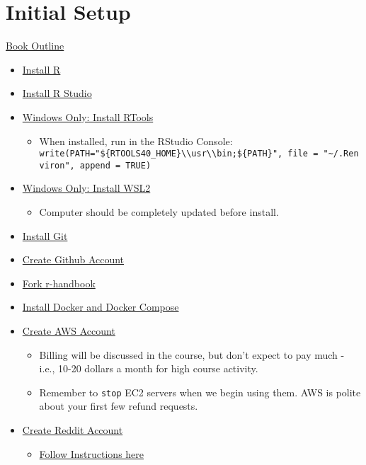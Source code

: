 \documentclass[
]{book}
\providecommand{\tightlist}{%
  \setlength{\itemsep}{0pt}\setlength{\parskip}{0pt}}
\begin{document}
\hypertarget{initial-setup}{%
\chapter{Initial Setup}\label{initial-setup}}

\href{https://hackmd.io/vGRGEPo8QQyiG8gecWv71g}{Book Outline}

\begin{itemize}
\item
  \href{https://cran.r-project.org/}{Install R}
\item
  \href{https://www.rstudio.com/products/rstudio/download/}{Install R Studio}
\item
  \href{https://cran.r-project.org/bin/windows/Rtools/}{Windows Only: Install RTools}

  \begin{itemize}
  \tightlist
  \item
    When installed, run in the RStudio Console: \texttt{write(\textquotesingle{}PATH="\$\{RTOOLS40\_HOME\}\textbackslash{}\textbackslash{}usr\textbackslash{}\textbackslash{}bin;\$\{PATH\}"\textquotesingle{},\ file\ =\ "\textasciitilde{}/.Renviron",\ append\ =\ TRUE)}
  \end{itemize}
\item
  \href{https://www.omgubuntu.co.uk/how-to-install-wsl2-on-windows-10}{Windows Only: Install WSL2}

  \begin{itemize}
  \tightlist
  \item
    Computer should be completely updated before install.
  \end{itemize}
\item
  \href{https://git-scm.com/downloads}{Install Git}
\item
  \href{https://github.com/}{Create Github Account}
\item
  \href{https://github.com/fdrennan/r-handbook}{Fork r-handbook}
\item
  \href{https://docs.docker.com/get-docker/}{Install Docker and Docker Compose}
\item
  \href{https://aws.amazon.com/}{Create AWS Account}

  \begin{itemize}
  \tightlist
  \item
    Billing will be discussed in the course, but don't expect to pay much - i.e., 10-20 dollars a month for high course activity.
  \item
    Remember to \texttt{stop} EC2 servers when we begin using them. AWS is polite about your first few refund requests.
  \end{itemize}
\item
  \href{reddit.com}{Create Reddit Account}

  \begin{itemize}
  \tightlist
  \item
    \href{https://towardsdatascience.com/how-to-use-the-reddit-api-in-python-5e05ddfd1e5c}{Follow Instructions here}
  \end{itemize}
\end{itemize}
\end{document}

